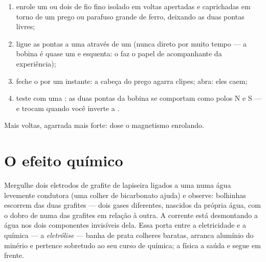 \begin{method}\label{met:g8:electric-current-effects:wind}
\begin{enumerate}
  \item enrole um  ou dois de fio fino isolado em voltas
        apertadas e caprichadas em torno de um prego ou parafuso
        grande de ferro, deixando as duas pontas livres;
  \item ligue as pontas a uma  através de um  (nunca
        direto por muito tempo --- a bobina é quase um 
        e esquenta: o  faz o papel de acompanhante da
        experiência);
  \item feche o  por um instante: a cabeça do prego agarra
        clipes; abra: eles caem;
  \item teste com uma : as duas pontas da bobina se comportam
        como polos N e S --- e trocam quando você inverte a .
\end{enumerate}
Mais voltas, agarrada mais forte: dose o magnetismo enrolando.
\end{method}

\section{O efeito químico}

\begin{example}\label{ex:g8:electric-current-effects:electrolysis}
Mergulhe dois eletrodos de grafite de lapiseira ligados a uma 
numa água levemente condutora (uma colher de bicarbonato ajuda) e
observe: bolhinhas escorrem das duas grafites --- dois gases
diferentes, nascidos da própria água, com o dobro de  numa das
grafites em relação à outra. A corrente está desmontando a água nos
dois componentes invisíveis dela. Essa porta entre a eletricidade e a
química --- a \emph{eletrólise} --- banha de prata colheres baratas,
arranca alumínio do minério e pertence sobretudo ao seu curso de
química; a física a saúda e segue em frente.
\end{example}

